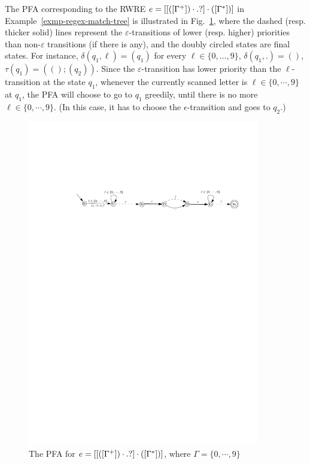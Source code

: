 \begin{example}\label{exmp-pfa}
The PFA corresponding to the RWRE $e = [[([\Gamma^+])\cdot .?] \cdot ([\Gamma^*])]$ in Example~\ref{exmp-regex-match-tree} is illustrated in Fig.~\ref{fig-pfa}, where the dashed (resp. thicker solid) lines represent the $\varepsilon$-transitions of lower (resp. higher) priorities than non-$\varepsilon$ transitions (if there is any), and the doubly circled states are final states. For instance, $\delta(q_1, \ell) = (q_1)$ for every $\ell \in \{0, \dots, 9\}$, $\delta(q_1, .) = ()$, $\tau(q_1) = ((); (q_2))$. Since the $\varepsilon$-transition has lower priority than the $\ell$-transition at the state $q_1$, whenever the currently scanned letter is $\ell \in \{0,\cdots,9\}$ at $q_1$,  the PFA will choose to go to $q_1$ greedily, until there is no more $\ell  \in \{0,\cdots,9\}$. (In this case, it has to choose the $\epsilon$-transition and goes to $q_2$.)
%
\begin{figure}[ht]
\centering
\includegraphics[width=0.9\textwidth]{pfa-new.pdf}
\caption{The PFA for $e = [[([\Gamma^+])\cdot .?] \cdot ([\Gamma^*])]$, where $\Gamma = \{0, \cdots, 9\}$}
\label{fig-pfa}
\vspace{-4mm}
\end{figure}
\end{example}

